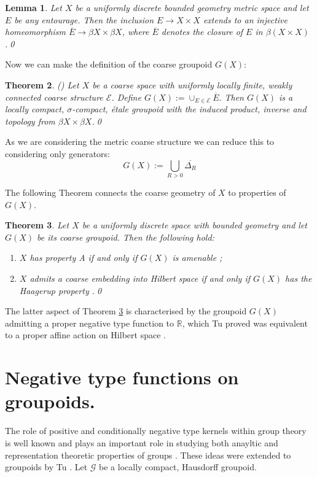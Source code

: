 \documentclass[11pt]{amsart}
\theoremstyle{plain}
\newtheorem{theorem}{Theorem}%
\newtheorem{lemma}[theorem]{Lemma}%
\theoremstyle{definition}%
\theoremstyle{remark}%
\newcommand{\G}{\mathcal{G}}
\begin{document}
\begin{lemma}\label{Lem:CorRoe} 
Let $X$ be a uniformly discrete bounded geometry metric space and let $E$ be any entourage. Then the inclusion $E \rightarrow X \times X$ extends to an injective homeomorphism $\overline{E} \rightarrow \beta X \times \beta X$, where $\overline{E}$ denotes the closure of $E$ in $\beta(X \times X)$.\qed
\end{lemma}
Now we can make the definition of the coarse groupoid $G(X)$:
\begin{theorem}(\cite[Theorem 10.20]{MR2007488})
Let $X$ be a coarse space with uniformly locally finite, weakly connected coarse structure $\mathcal{E}$. Define $G(X):=\cup_{E\in \mathcal{E}}\overline{E}.$ Then $G(X)$ is a locally compact, $\sigma$-compact, \'etale groupoid with the induced product, inverse and topology from $\beta X \times \beta X$.\qed
\end{theorem}
As we are considering the metric coarse structure we can reduce this to considering only generators:
\begin{equation*}
G(X):=\bigcup_{R>0}\overline{\Delta_{R}}
\end{equation*}

The following Theorem connects the coarse geometry of $X$ to properties of $G(X)$.

\begin{theorem}\label{thm:coarseprop}
Let $X$ be a uniformly discrete space with bounded geometry and let $G(X)$ be its coarse groupoid. Then the following hold:
\begin{enumerate}
\item $X$ has property A if and only if $G(X)$ is amenable \cite[Theorem 5.3]{MR1905840};
\item $X$ admits a coarse embedding into Hilbert space if and only if $G(X)$ has the Haagerup property \cite[Theorem 5.4]{MR1905840}.\qed
\end{enumerate}
\end{theorem}

The latter aspect of Theorem \ref{thm:coarseprop} is characterised by the groupoid $G(X)$ admitting a proper negative type function to $\mathbb{R}$, which Tu proved was equivalent to a proper affine action on Hilbert space \cite{MR1703305}.

\section{Negative type functions on groupoids.}\label{sect:negtype}
The role of positive and conditionally negative type kernels within group theory is well known and plays an important role in studying both anayltic and representation theoretic properties of groups \cite{MR2415834,MR1487204}. These ideas were extended to groupoids by Tu \cite{MR1703305}. Let $\G$ be a locally compact, Hausdorff groupoid.
\end{document}
